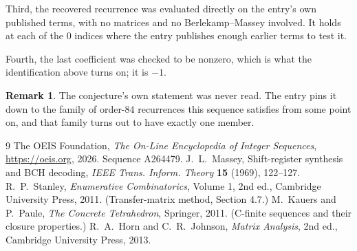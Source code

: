\documentclass[11pt,a4paper]{article}
\theoremstyle{plain}
\theoremstyle{definition}
\newtheorem{remark}[theorem]{Remark}
\begin{document}
Third, the recovered recurrence was evaluated directly on the entry's own published terms, with
no matrices and no Berlekamp--Massey involved. It holds at each of the $0$ indices where
the entry publishes enough earlier terms to test it.

Fourth, the last coefficient was checked to be nonzero, which is what the identification above
turns on; it is $-1$.

\begin{remark}
The conjecture's own statement was never read. The entry pins it down to the family of
order-$84$ recurrences this sequence satisfies from some point on, and that family turns
out to have exactly one member.
\end{remark}

\begin{thebibliography}{9}
 The OEIS Foundation, \emph{The On-Line Encyclopedia of Integer
Sequences}, \url{https://oeis.org}, 2026. Sequence A264479.
 J.~L.~Massey, Shift-register synthesis and BCH decoding, \emph{IEEE
Trans. Inform. Theory} \textbf{15} (1969), 122--127.
 R.~P.~Stanley, \emph{Enumerative Combinatorics}, Volume 1, 2nd ed.,
Cambridge University Press, 2011. (Transfer-matrix method, Section 4.7.)
 M.~Kauers and P.~Paule, \emph{The Concrete Tetrahedron}, Springer, 2011.
(C-finite sequences and their closure properties.)
 R.~A.~Horn and C.~R.~Johnson, \emph{Matrix Analysis}, 2nd ed., Cambridge
University Press, 2013.
\end{thebibliography}
\end{document}
